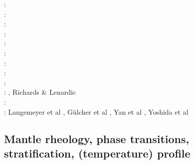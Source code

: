 \begin{scriptsize}
\twothousandnine: \cite{wodd09}\cite{fobe09}\cite{gows09}\cite{deta09}\cite{onlj09}\cite{wazh09}\cite{vavv09}
      \cite{brha09}\cite{scbs09b}\cite{oebm09}\cite{fuog09}\\
\twothousandten: \cite{bumb10}\cite{detn10}\cite{yayh10}\cite{nata10}\cite{hole10}\cite{zhzl10}\cite{vayb10}
      \cite{brmw10}\\
\twothousandeleven: \cite{lowm11}\cite{rota11}\cite{woda11}\cite{lemj11}\cite{befa11}\cite{pewb11}\\
\twothousandtwelve: \cite{bisa12}\cite{cort12b}\cite{deyt12}\cite{solo12}\cite{wele12}\\
\twothousandthirteen: \cite{holj13}\cite{dadb13}\cite{toyd13}\cite{bogs13a}\cite{busa13}\cite{mika13}
      \cite{fabc13}\cite{cosr13}\cite{coml13}\cite{cost13}\cite{stha13}\cite{plth13}\cite{oflb13}\\
\twothousandfourteen: \cite{arfw14}\cite{helo14}\cite{crta14}\cite{flgw14}\cite{roct14}\cite{cort14}\cite{becr14}
      \cite{nata14}\cite{stha14}\cite{stlh14}\cite{ogaw14}\\
\twothousandfifteen: \cite{thkp15}\cite{wegg15}\cite{bect15}\cite{pesw15}\\
\twothousandsixteen: \cite{frbs16}\cite{sisc16}\cite{boba16}\cite{wele16}\cite{welm16}\cite{vade16}\cite{chah16}\\
\twothousandseventeen: \cite{ghts17}\cite{civj17}\\
\twothousandeighteen: \cite{cold18}\cite{arcf18}\cite{cosh18}\cite{wele18}, Richards \& Lenardic \cite{rile18}\\
\twothousandnineteen: \cite{gult19}\cite{mazh19}\cite{cohf19}\cite{lewh19}\cite{ulcw19}\cite{boba19}\cite{fube19}
      \cite{plju19}\\
\twothousandtwenty: Langemeyer et al \cite{lalt20}, G\"ulcher et al \cite{gugb20}, Yan et al \cite{yabt20}, Yoshida et al \cite{yosy20}
\end{scriptsize}

\subsection{Mantle rheology, phase transitions, stratification, (temperature) profile}

